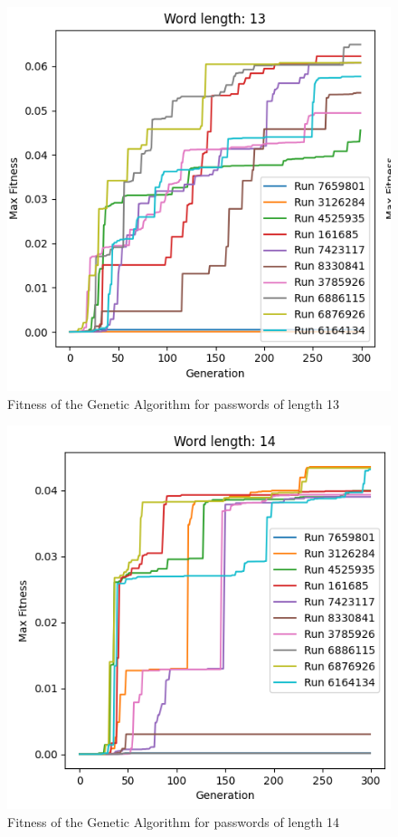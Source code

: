 \documentclass[sigconf,authordraft]{acmart}
\begin{document}
\begin{figure}
  \includegraphics[width=\columnwidth]{genetic_results_13.png}
  \caption{Fitness of the Genetic Algorithm for passwords of length 13}
  \label{fig:fitness_genetic_13}
\end{figure}

\begin{figure}
  \includegraphics[width=\columnwidth]{genetic_results_14.png}
  \caption{Fitness of the Genetic Algorithm for passwords of length 14}
  \label{fig:fitness_genetic_14}
\end{figure}
\end{document}
